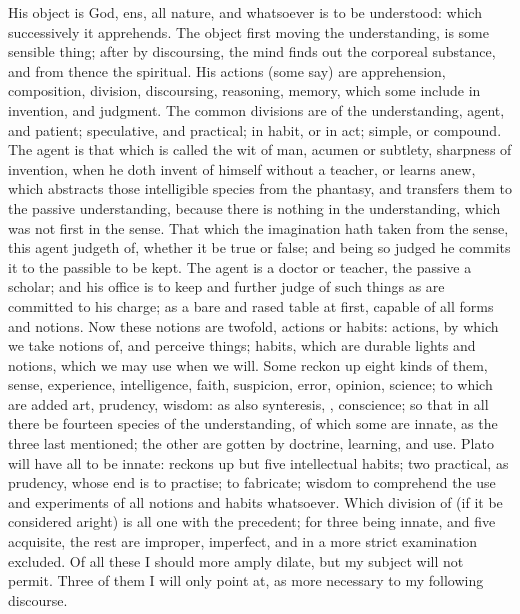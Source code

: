 {His object is God, ens, all nature, and whatsoever is to be understood:
which successively it apprehends. The object first moving the
understanding, is some sensible thing; after by discoursing, the mind
finds out the corporeal substance, and from thence the spiritual. His
actions (some say) are apprehension, composition, division,
discoursing, reasoning, memory, which some include in invention, and
judgment. The common divisions are of the understanding, agent, and
patient; speculative, and practical; in habit, or in act; simple, or
compound. The agent is that which is called the wit of man, acumen or
subtlety, sharpness of invention, when he doth invent of himself
without a teacher, or learns anew, which abstracts those intelligible
species from the phantasy, and transfers them to the passive
understanding, because there is nothing in the understanding,
which was not first in the sense. That which the imagination hath taken
from the sense, this agent judgeth of, whether it be true or false; and
being so judged he commits it to the passible to be kept. The agent is
a doctor or teacher, the passive a scholar; and his office is to keep
and further judge of such things as are committed to his charge; as a
bare and rased table at first, capable of all forms and notions. Now
these notions are twofold, actions or habits: actions, by which we take
notions of, and perceive things; habits, which are durable lights and
notions, which we may use when we will. Some reckon up eight kinds of
them, sense, experience, intelligence, faith, suspicion, error,
opinion, science; to which are added art, prudency, wisdom: as also
synteresis, , conscience; so that in all there
be fourteen species of the understanding, of which some are innate, as
the three last mentioned; the other are gotten by doctrine, learning,
and use. Plato will have all to be innate: \Aristotle reckons up but
five intellectual habits; two practical, as prudency, whose end is to
practise; to fabricate; wisdom to comprehend the use and experiments of
all notions and habits whatsoever. Which division of \Aristotle (if it
be considered aright) is all one with the precedent; for three being
innate, and five acquisite, the rest are improper, imperfect, and in a
more strict examination excluded. Of all these I should more amply
dilate, but my subject will not permit. Three of them I will only point
at, as more necessary to my following discourse.

}

